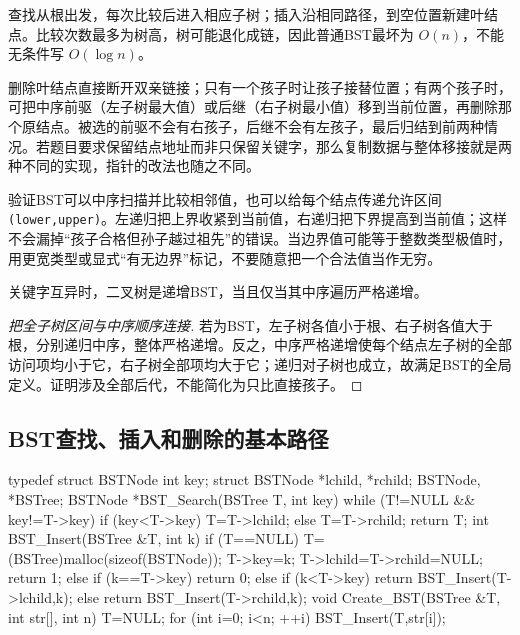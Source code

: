 查找从根出发，每次比较后进入相应子树；插入沿相同路径，到空位置新建叶结点。比较次数最多为树高，树可能退化成链，因此普通BST最坏为 \(O(n)\)，不能无条件写 \(O(\log n)\)。

删除叶结点直接断开双亲链接；只有一个孩子时让孩子接替位置；有两个孩子时，可把中序前驱（左子树最大值）或后继（右子树最小值）移到当前位置，再删除那个原结点。被选的前驱不会有右孩子，后继不会有左孩子，最后归结到前两种情况。若题目要求保留结点地址而非只保留关键字，那么复制数据与整体移接就是两种不同的实现，指针的改法也随之不同。

验证BST可以中序扫描并比较相邻值，也可以给每个结点传递允许区间 \texttt{(\allowbreak{}lower,\allowbreak{}upper)\allowbreak{}}。左递归把上界收紧到当前值，右递归把下界提高到当前值；这样不会漏掉``孩子合格但孙子越过祖先''的错误。当边界值可能等于整数类型极值时，用更宽类型或显式``有无边界''标记，不要随意把一个合法值当作无穷。

\begin{theorem}[BST的中序判据]

关键字互异时，二叉树是递增BST，当且仅当其中序遍历严格递增。

\end{theorem}

\begin{proof}[把全子树区间与中序顺序连接]

若为BST，左子树各值小于根、右子树各值大于根，分别递归中序，整体严格递增。反之，中序严格递增使每个结点左子树的全部访问项均小于它，右子树全部项均大于它；递归对子树也成立，故满足BST的全局定义。证明涉及全部后代，不能简化为只比直接孩子。

\end{proof}

\subsection{BST查找、插入和删除的基本路径}\label{DS07-bst-code}

\par\medskip\noindent\begin{minipage}{\linewidth}
\begin{codeblock}[language=C++]
typedef struct BSTNode {
    int key;
    struct BSTNode *lchild, *rchild;
} BSTNode, *BSTree;
BSTNode *BST_Search(BSTree T, int key) {
    while (T!=NULL && key!=T->key) {
        if (key<T->key) T=T->lchild;
        else T=T->rchild;
    }
    return T;
}
int BST_Insert(BSTree &T, int k) {
    if (T==NULL) {
        T=(BSTree)malloc(sizeof(BSTNode));
        T->key=k;
        T->lchild=T->rchild=NULL;
        return 1;
    } else if (k==T->key) return 0;
    else if (k<T->key) return BST_Insert(T->lchild,k);
    else return BST_Insert(T->rchild,k);
}
void Create_BST(BSTree &T, int str[], int n) {
    T=NULL;
    for (int i=0; i<n; ++i) BST_Insert(T,str[i]);
}
\end{codeblock}
\end{minipage}\par\medskip

